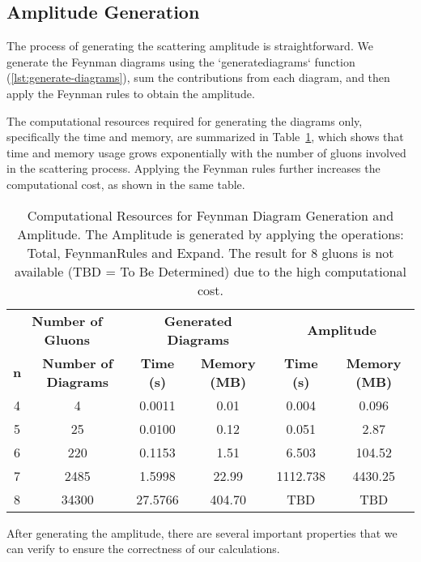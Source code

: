 \documentclass[main.tex]{subfiles}
\begin{document}
\subsection{Amplitude Generation}

The process of generating the scattering amplitude is straightforward. We generate the Feynman diagrams using the `generatediagrams` function (\cref{lst:generate-diagrams}), sum 
the contributions from each diagram, and then apply the Feynman rules to obtain the amplitude. 

The computational resources required for generating the diagrams only, specifically the time and memory, are summarized in Table~\ref{tab:computational-resources},
which shows that time and memory usage grows exponentially with the number of gluons involved in the scattering process.
Applying the Feynman rules further increases the computational cost, as shown in the same table.


\begin{table}[htbp]
    \centering
    \caption{Computational Resources for Feynman Diagram Generation and Amplitude. The Amplitude
    is generated by applying the operations: Total, FeynmanRules and Expand. The result for 
    8 gluons is not available (TBD = To Be Determined) due to the high computational cost.} 
    \label{tab:computational-resources}
    \begin{tabular}{|c|c|c|c|c|c|}
        \hline
        \multicolumn{2}{|c|}{\textbf{Number of Gluons}} & \multicolumn{2}{|c|}{\textbf{Generated Diagrams}} & \multicolumn{2}{|c|}{\textbf{Amplitude}} \\
        \cline{1-6} %
        \textbf{n} & \textbf{Number of Diagrams} & \textbf{Time (s)} & \textbf{Memory (MB)} & \textbf{Time (s)} & \textbf{Memory (MB)} \\
        \hline
        4 & 4 & 0.0011 & 0.01 & 0.004 & 0.096 \\
        5 & 25 & 0.0100 & 0.12 & 0.051 & 2.87 \\
        6 & 220 & 0.1153 & 1.51 & 6.503 & 104.52 \\
        7 & 2485 & 1.5998 & 22.99 & 1112.738 & 4430.25 \\
        8 & 34300 & 27.5766 & 404.70 & TBD & TBD \\
        \hline
    \end{tabular}
\end{table}

After generating the amplitude, there are several important properties that we can verify to ensure the correctness of our calculations.
\end{document}
